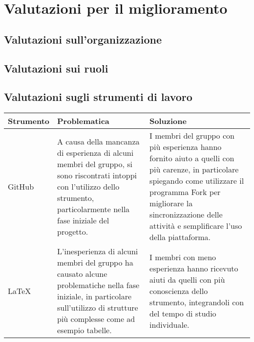 \chapter{Valutazioni per il miglioramento}\label{valutazioni-per-il-miglioramento}

\section{Valutazioni sull'organizzazione}

\section{Valutazioni sui ruoli}

\section{Valutazioni sugli strumenti di lavoro}

\begin{center}
    \begin{xltabular}{\linewidth}{|l|X|X|}
    \hline
    \textbf{Strumento} & \textbf{Problematica} & \textbf{Soluzione} \\
    \hline
     GitHub & A causa della mancanza di esperienza di alcuni membri del gruppo, si sono riscontrati intoppi con l'utilizzo dello strumento, particolarmente nella fase iniziale del progetto. & I membri del gruppo con più esperienza hanno fornito aiuto a quelli con più carenze, in particolare spiegando come utilizzare il programma Fork per migliorare la sincronizzazione delle attività e semplificare l'uso della piattaforma. \\
     LaTeX & L'inesperienza di alcuni membri del gruppo ha causato alcune problematiche nella fase iniziale, in particolare sull'utilizzo di strutture più complesse come ad esempio tabelle. & I membri con meno esperienza hanno ricevuto aiuti da quelli con più conoscienza dello strumento, integrandoli con del tempo di studio individuale. \\

    \hline

    \end{xltabular}
\end{center}